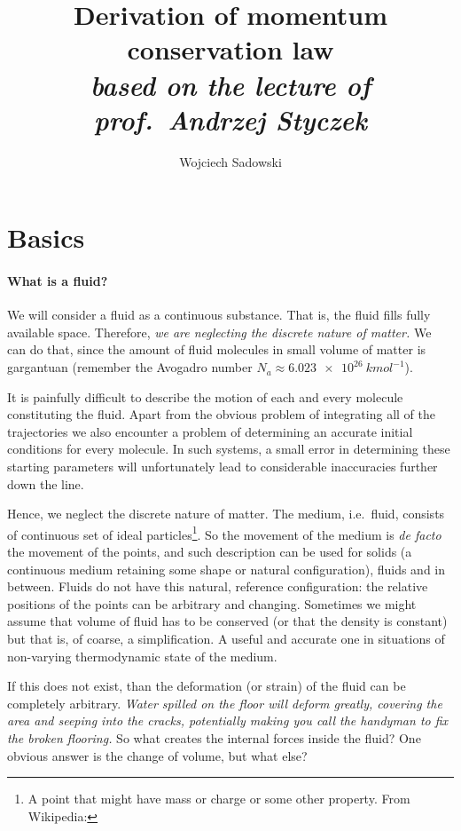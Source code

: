 \documentclass[a4paper]{article}
\title{Derivation of momentum conservation law\\
\large \textit{based on the lecture of prof.\ Andrzej Styczek}}
\author{Wojciech Sadowski}
\begin{document}
\maketitle

\section{Basics}

\paragraph{What is a fluid?}
We will consider a fluid as a continuous substance. That is, the fluid fills
fully available space. Therefore, \emph{we are neglecting the discrete nature
of matter.} We can do that, since the amount of fluid molecules in small volume 
of matter is gargantuan (remember the Avogadro number \(N_a\approx\SI{6.023e26}{kmol^{-1}}\)).

It is painfully difficult to describe the motion of each and every molecule 
constituting the fluid. Apart from the obvious problem of integrating all of 
the trajectories we also encounter a problem of determining an accurate initial
conditions for every molecule. In such systems, a small error in determining 
these starting parameters will unfortunately lead to considerable inaccuracies
further down the line.

Hence, we neglect the discrete nature of matter. The medium, i.e.\ fluid, consists 
of continuous set of ideal particles\footnote{%
A point that might have mass or charge or some other 
property. From Wikipedia: }.
So the movement of the medium is 
\emph{de facto} the movement of the points, and such description can be 
used for solids (a continuous medium retaining some shape or natural configuration),
fluids and  in between. Fluids do not have this natural, reference 
configuration: the relative positions of the points can be arbitrary and changing.
Sometimes we might assume that volume of fluid has to be conserved (or that the 
density is constant) but that is, of coarse, a simplification. A useful and 
accurate one in situations of non-varying thermodynamic state of the medium.

If this  does not exist, than the deformation (or strain) of the fluid
can be completely arbitrary. \emph{Water spilled on the floor will deform greatly,
covering the area and seeping into the cracks, potentially making you call the 
handyman to fix the broken flooring.} So what creates the internal forces inside 
the fluid? One obvious answer is the change of volume, but what else?
\end{document}
